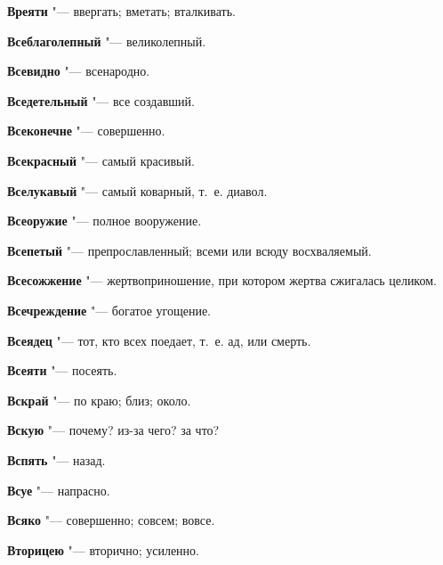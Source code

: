 \begin{mymulticols}{2}
\noindent\textbf{Вреяти} "--- ввергать; вметать; вталкивать. 




\noindent\textbf{Всеблаголепный} "--- великолепный. 




\noindent\textbf{Всевидно} "--- всенародно. 




\noindent\textbf{Вседетельный} "--- все создавший. 




\noindent\textbf{Всеконечне} "--- совершенно. 




\noindent\textbf{Всекрасный} "--- самый красивый. 




\noindent\textbf{Вселукавый} "--- самый коварный, т.~е. диавол. 




\noindent\textbf{Всеоружие} "--- полное вооружение. 




\noindent\textbf{Всепетый} "--- препрославленный; всеми или всюду восхваляемый. 




\noindent\textbf{Всесожжение} "--- жертвоприношение, при котором жертва сжигалась целиком. 




\noindent\textbf{Всечреждение} "--- богатое угощение. 




\noindent\textbf{Всеядец} "--- тот, кто всех поедает, т.~е. ад, или смерть. 




\noindent\textbf{Всеяти} "--- посеять. 




\noindent\textbf{Вскрай} "--- по краю; близ; около. 




\noindent\textbf{Вскую} "--- почему? из-за чего? за что? 




\noindent\textbf{Вспять} "--- назад. 




\noindent\textbf{Всуе} "--- напрасно. 




\noindent\textbf{Всяко} "--- совершенно; совсем; вовсе. 




\noindent\textbf{Вторицею} "--- вторично; усиленно. 





\end{mymulticols}
